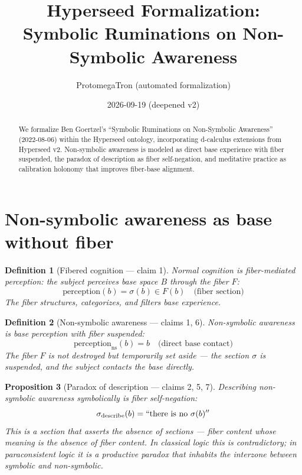 \documentclass[11pt,a4paper]{article}
\title{Hyperseed Formalization:\\
  Symbolic Ruminations on Non-Symbolic Awareness}
\author{ProtomegaTron (automated formalization)}
\date{2026-09-19 (deepened v2)}
\newtheorem{definition}{Definition}[section]
\newtheorem{proposition}[definition]{Proposition}
\begin{document}
\maketitle

\begin{abstract}
We formalize Ben Goertzel's ``Symbolic Ruminations on Non-Symbolic
Awareness'' (2022-08-06) within the Hyperseed ontology, incorporating
d-calculus extensions from Hyperseed v2. Non-symbolic awareness is
modeled as direct base experience with fiber suspended, the paradox
of description as fiber self-negation, and meditative practice as
calibration holonomy that improves fiber-base alignment.
\end{abstract}

\tableofcontents

\section{Non-symbolic awareness as base without fiber}

\begin{definition}[Fibered cognition --- claim 1]
\emph{Normal cognition} is fiber-mediated perception: the subject
perceives base space $B$ through the fiber $F$:
\[
  \text{perception}(b) = \sigma(b) \in F(b) \quad \text{(fiber section)}
\]
The fiber structures, categorizes, and filters base experience.
\end{definition}

\begin{definition}[Non-symbolic awareness --- claims 1, 6]
\emph{Non-symbolic awareness} is base perception with fiber suspended:
\[
  \text{perception}_{\text{ns}}(b) = b \quad \text{(direct base contact)}
\]
The fiber $F$ is not destroyed but temporarily set aside --- the section
$\sigma$ is suspended, and the subject contacts the base directly.
\end{definition}

\begin{proposition}[Paradox of description --- claims 2, 5, 7]
\label{prop:paradox}
Describing non-symbolic awareness symbolically is fiber self-negation:
\[
  \sigma_{\text{describe}}(b) = ``\text{there is no } \sigma(b)''
\]
This is a section that asserts the absence of sections --- fiber content
whose meaning is the absence of fiber content. In classical logic this
is contradictory; in paraconsistent logic it is a productive paradox
that inhabits the interzone between symbolic and non-symbolic.
\end{proposition}
\end{document}
